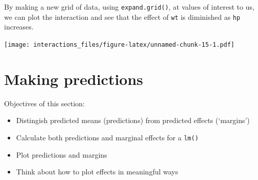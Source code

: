 \documentclass[]{article}
\newenvironment{Shaded}{\begin{snugshade}}{\end{snugshade}}
\newcommand{\DataTypeTok}[1]{\textcolor[rgb]{0.13,0.29,0.53}{#1}}
\newcommand{\DecValTok}[1]{\textcolor[rgb]{0.00,0.00,0.81}{#1}}
\newcommand{\FloatTok}[1]{\textcolor[rgb]{0.00,0.00,0.81}{#1}}
\newcommand{\KeywordTok}[1]{\textcolor[rgb]{0.13,0.29,0.53}{\textbf{#1}}}
\newcommand{\NormalTok}[1]{#1}
\newcommand{\OperatorTok}[1]{\textcolor[rgb]{0.81,0.36,0.00}{\textbf{#1}}}
\newcommand{\StringTok}[1]{\textcolor[rgb]{0.31,0.60,0.02}{#1}}
\providecommand{\tightlist}{%
  \setlength{\itemsep}{0pt}\setlength{\parskip}{0pt}}
\begin{document}
By making a new grid of data, using \texttt{expand.grid()}, at values of interest to
us, we can plot the interaction and see that the effect of \texttt{wt} is diminished as
\texttt{hp} increases.

\begin{Shaded}
\end{Shaded}

\texttt{[image: interactions\_files/figure-latex/unnamed-chunk-15-1.pdf]}

\hypertarget{predictions-and-margins}{%
\section{Making predictions}\label{predictions-and-margins}}

Objectives of this section:

\begin{itemize}
\tightlist
\item
  Distingish predicted means (predictions) from predicted effects (`margins')
\item
  Calculate both predictions and marginal effects for a \texttt{lm()}
\item
  Plot predictions and margins
\item
  Think about how to plot effects in meaningful ways
\end{itemize}
\end{document}
